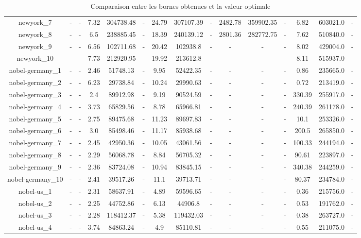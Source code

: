 \documentclass[main.tex]{subfiles}
\begin{document}
\begin{landscape}
\begin{table}[h]
\begin{tabular}{c|cc|ccc|ccc|ccc|ccc}
	newyork\_7 &- &- &7.32 &304738.48 &- &24.79 &307107.39 &- &2482.78 &359902.35 &- &6.82 &603021.0 &-\\
	newyork\_8 &- &- &6.5 &238885.45 &- &18.39 &240139.12 &- &2801.36 &282772.75 &- &7.62 &510840.0 &-\\
	newyork\_9 &- &- &6.56 &102711.68 &- &20.42 &102938.8 &- &- &- &- &8.02 &429004.0 &-\\
	newyork\_10 &- &- &7.73 &212920.95 &- &19.92 &213612.8 &- &- &- &- &8.11 &515937.0 &-\\
	nobel-germany\_1 &- &- &2.46 &51748.13 &- &9.95 &52422.35 &- &- &- &- &0.86 &235665.0 &-\\
	nobel-germany\_2 &- &- &6.23 &29738.84 &- &10.24 &29990.63 &- &- &- &- &0.72 &213419.0 &-\\
	nobel-germany\_3 &- &- &2.4 &89912.98 &- &9.19 &90524.59 &- &- &- &- &330.39 &255917.0 &-\\
	nobel-germany\_4 &- &- &3.73 &65829.56 &- &8.78 &65966.81 &- &- &- &- &240.39 &261178.0 &-\\
	nobel-germany\_5 &- &- &2.75 &89475.68 &- &11.23 &89697.83 &- &- &- &- &10.1 &253326.0 &-\\
	nobel-germany\_6 &- &- &3.0 &85498.46 &- &11.17 &85938.68 &- &- &- &- &200.5 &265850.0 &-\\
	nobel-germany\_7 &- &- &2.45 &42950.36 &- &10.05 &43061.56 &- &- &- &- &100.33 &244194.0 &-\\
	nobel-germany\_8 &- &- &2.29 &56068.78 &- &8.84 &56705.32 &- &- &- &- &90.61 &223897.0 &-\\
	nobel-germany\_9 &- &- &2.36 &83724.08 &- &10.94 &83845.15 &- &- &- &- &340.38 &244259.0 &-\\
	nobel-germany\_10 &- &- &2.41 &39517.26 &- &11.1 &39713.71 &- &- &- &- &80.37 &234784.0 &-\\
	nobel-us\_1 &- &- &2.31 &58637.91 &- &4.89 &59596.65 &- &- &- &- &0.36 &215756.0 &-\\
	nobel-us\_2 &- &- &2.25 &44752.86 &- &6.13 &44906.8 &- &- &- &- &0.53 &191762.0 &-\\
	nobel-us\_3 &- &- &2.28 &118412.37 &- &5.38 &119432.03 &- &- &- &- &0.38 &263727.0 &-\\
	nobel-us\_4 &- &- &3.74 &84863.24 &- &4.9 &85110.81 &- &- &- &- &0.55 &211075.0 &-\\
\end{tabular}\caption{Comparaison entre les bornes obtenues et la valeur optimale}
\end{table}
\end{landscape}
\end{document}
